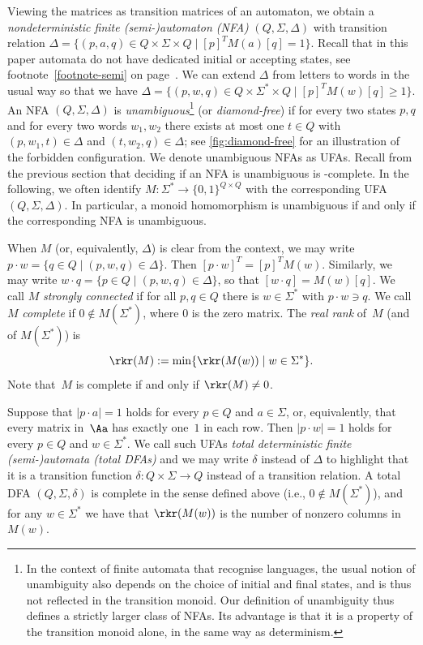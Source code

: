 \noindent
Viewing the matrices as transition matrices of an automaton, we obtain a \emph{nondeterministic finite (semi-)automaton (NFA)} $(Q, \Sigma, \Delta)$ with transition relation $\Delta = \{(p,a,q) \in Q \times \Sigma \times Q \mid [p]^T M(a) [q] = 1\}$.
Recall that in this paper automata do not have dedicated initial or accepting states, see footnote~\ref{footnote-semi} on page~\pageref{footnote-semi}.
We can extend $\Delta$ from letters to words in the usual way so that we have $\Delta = \{(p,w,q) \in Q \times \Sigma^* \times Q \mid [p]^T M(w) [q] \ge 1\}$.
An NFA $(Q, \Sigma, \Delta)$ is \emph{unambiguous}\footnote{In the context of finite automata that recognise languages, the usual notion of unambiguity also depends on the choice of initial and final states, and is thus not reflected in the transition monoid. Our definition of unambiguity thus defines a strictly larger class of NFAs. Its advantage is that it is a property of the transition monoid alone, in the same way as determinism.} (or \emph{diamond-free}) if for every two states $p,q$ and for every two words $w_1, w_2$ there exists at most one $t \in Q$ with $(p,w_1,t) \in \Delta$ and $(t,w_2,q) \in \Delta$; see \autoref{fig:diamond-free} for an illustration of the forbidden configuration. We denote unambiguous NFAs as UFAs. Recall from the previous section that deciding if an NFA is unambiguous is \NL-complete. In the following, we often identify $M \colon \Sigma^* \to \{0,1\}^{Q \times Q}$ with the corresponding UFA $(Q, \Sigma, \Delta)$. In particular, a monoid homomorphism is unambiguous if and only if the corresponding NFA is unambiguous.


When $M$ (or, equivalently, $\Delta$) is clear from the context, we may write $p \cdot w = \{q \in Q \mid (p,w,q) \in \Delta\}$.
Then $[p \cdot w]^T = [p]^T M(w)$.
Similarly, we may write $w \cdot q = \{p \in Q \mid (p,w,q) \in \Delta\}$, so that $[w \cdot q] = M(w) [q]$. 
We call $M$ \emph{strongly connected} if for all $p,q \in Q$ there is $w \in \Sigma^*$ with $p \cdot w \ni q$. 
We call $M$ \emph{complete} if $0 \not\in M(\Sigma^*)$, where $0$ is the zero matrix.
The \emph{real rank} of~$M$ (and of $M(\Sigma^*)$) is 
\[\rkr(M) := \min\{\rkr(M(w)) \mid w \in \Sigma^*\}.\]
Note that~$M$ is complete if and only if $\rkr(M) \ne 0$.

Suppose that $|p \cdot a| = 1$ holds for every $p \in Q$ and $a \in \Sigma$, or, equivalently, that every matrix in~$\Aa$ has exactly one~$1$ in each row.
Then $|p \cdot w| = 1$ holds for every $p \in Q$ and $w \in \Sigma^*$.
We call such UFAs \emph{total deterministic finite (semi-)automata (total DFAs)} and we may write $\delta$ instead of $\Delta$ to highlight that it is a transition function $\delta \colon Q \times \Sigma \to Q$ instead of a transition relation.
A total DFA $(Q, \Sigma, \delta)$ is complete in the sense defined above (i.e., $0 \not\in M(\Sigma^*)$), and for any $w \in \Sigma^*$ we have that $\rkr(M(w))$ is the number of nonzero columns in~$M(w)$.


